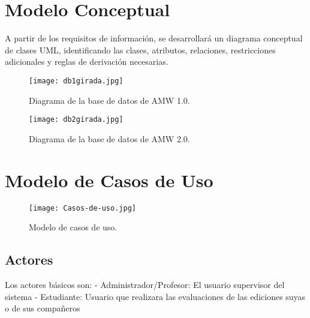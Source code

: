


\section{Modelo Conceptual}

A partir de los requisitos de información, se desarrollará un diagrama conceptual de clases UML, identificando las clases, atributos, relaciones, restricciones adicionales y reglas de derivación necesarias.

\begin{figure}
	\centering
	\texttt{[image: db1girada.jpg]}
	\caption{Diagrama de la base de datos de AMW 1.0.}
\end{figure}

\begin{figure}
	\centering
	\texttt{[image: db2girada.jpg]}
	\caption{Diagrama de la base de datos de AMW 2.0.}
\end{figure}

\newpage

\section{Modelo de Casos de Uso}

\begin{figure}
	\centering
	\texttt{[image: Casos-de-uso.jpg]}
	\caption{Modelo de casos de uso.}
\end{figure}

\subsection{Actores} 
Los actores básicos son:
\newline
- Administrador/Profesor: El usuario supervisor del sistema
\newline
- Estudiante: Usuario que realizara las evaluaciones de las ediciones suyas o de sus compañeros
\newline

